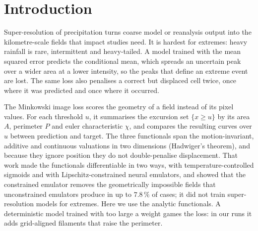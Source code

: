\documentclass{article}
\begin{document}
\section{Introduction}
Super-resolution of precipitation turns coarse model or reanalysis output into the kilometre-scale fields that
impact studies need. It is hardest for extremes: heavy rainfall is rare, intermittent and heavy-tailed. A model
trained with the mean squared error predicts the conditional mean, which spreads an uncertain peak over a wider
area at a lower intensity, so the peaks that define an extreme event are lost. The same loss also penalises a
correct but displaced cell twice, once where it was predicted and once where it occurred.

The Minkowski image loss \citep{quarenghi2026minkowski} scores the geometry of a field instead of its pixel values.
For each threshold $u$, it summarises the excursion set $\{x \ge u\}$ by its area $A$, perimeter $P$ and euler
characteristic $\chi$, and compares the resulting curves over $u$ between prediction and target. The three
functionals span the motion-invariant, additive and continuous valuations in two dimensions (Hadwiger's theorem),
and because they ignore position they do not double-penalise displacement. That work made the functionals
differentiable in two ways, with temperature-controlled sigmoids and with Lipschitz-constrained neural emulators, and
showed that the constrained emulator removes the geometrically impossible fields that unconstrained emulators produce
in up to $7.8\,\%$ of cases; it did not train super-resolution models for extremes. Here we use the analytic
functionals. A deterministic model trained with too large a weight games the loss: in our runs it adds grid-aligned
filaments that raise the perimeter.
\end{document}
